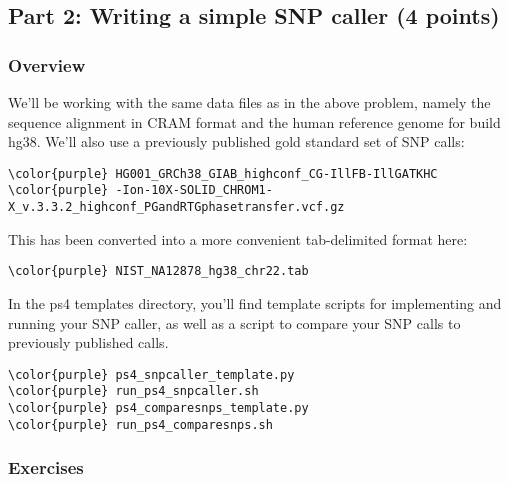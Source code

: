 \documentclass[12pt]{article}
\begin{document}
\subsection*{Part 2: Writing a simple SNP caller (4 points)}
\subsubsection*{Overview}

We'll be working with the same data files as in the above problem, namely the sequence alignment in CRAM format and the human reference genome for build hg38. We'll also use a previously published gold standard set of SNP calls:
\begin{Verbatim}[commandchars=\\\{\}]
\color{purple} HG001_GRCh38_GIAB_highconf_CG-IllFB-IllGATKHC
\color{purple} -Ion-10X-SOLID_CHROM1-X_v.3.3.2_highconf_PGandRTGphasetransfer.vcf.gz
\end{Verbatim}

This has been converted into a more convenient tab-delimited format here:
\begin{Verbatim}[commandchars=\\\{\}]
\color{purple} NIST_NA12878_hg38_chr22.tab
\end{Verbatim}


In the ps4 templates directory, you'll find template scripts for implementing and running your SNP caller, as well as a script to compare your SNP calls to previously published calls.
\begin{Verbatim}[commandchars=\\\{\}]
\color{purple} ps4_snpcaller_template.py
\color{purple} run_ps4_snpcaller.sh
\color{purple} ps4_comparesnps_template.py
\color{purple} run_ps4_comparesnps.sh
\end{Verbatim}

\subsubsection*{Exercises}
\end{document}
